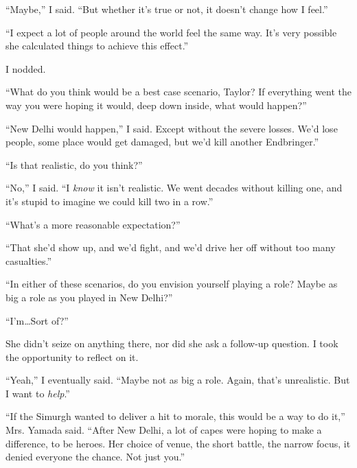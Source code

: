 ``Maybe,'' I said.  ``But whether it's true or not, it doesn't change how I feel.''



``I expect a lot of people around the world feel the same way.  It's very possible she calculated things to achieve this effect.''



I nodded.



``What do you think would be a best case scenario, Taylor?  If everything went the way you were hoping it would, deep down inside, what would happen?''



``New Delhi would happen,'' I said.  Except without the severe losses.  We'd lose people, some place would get damaged, but we'd kill another Endbringer.''



``Is that realistic, do you think?''



``No,'' I said.  ``I \emph{know} it isn't realistic.  We went decades without killing one, and it's stupid to imagine we could kill two in a row.''



``What's a more reasonable expectation?''



``That she'd show up, and we'd fight, and we'd drive her off without too many casualties.''



``In either of these scenarios, do you envision yourself playing a role?  Maybe as big a role as you played in New Delhi?''



``I'm\ldots Sort of?''



She didn't seize on anything there, nor did she ask a follow-up question.  I took the opportunity to reflect on it.



``Yeah,'' I eventually said.  ``Maybe not as big a role.  Again, that's unrealistic.  But I want to \emph{help}.''



``If the Simurgh wanted to deliver a hit to morale, this would be a way to do it,'' Mrs. Yamada said.  ``After New Delhi, a lot of capes were hoping to make a difference, to be heroes.  Her choice of venue, the short battle, the narrow focus, it denied everyone the chance.  Not just you.''



